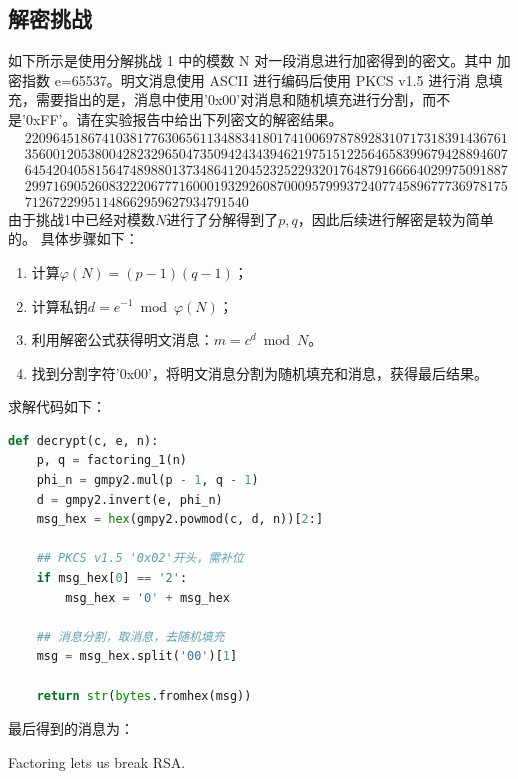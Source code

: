\subsection{解密挑战}

如下所示是使用分解挑战 1 中的模数 N 对一段消息进行加密得到的密文。其中
加密指数 e=65537。明文消息使用 ASCII 进行编码后使用 PKCS v1.5 进行消
息填充，需要指出的是，消息中使用'0x00'对消息和随机填充进行分割，而不
是'0xFF'。请在实验报告中给出下列密文的解密结果。\\

$
\begin{aligned}
    &220964518674103817763065611348834180174100697878928310717318391436761\\
        &356001205380042823296504735094243439462197515122564658399679428894607\\
        &645420405815647489880137348641204523252293201764879166664029975091887\\
        &299716905260832220677716000193292608700095799937240774589677736978175\\
        &71267229951148662959627934791540
\end{aligned}
$\\

由于挑战1中已经对模数$N$进行了分解得到了$p,q$，因此后续进行解密是较为简单的。
具体步骤如下：
\begin{enumerate}
    \item 计算$\varphi(N) = (p-1)(q-1)$；
    \item 计算私钥$d = e^{-1} \bmod \varphi(N)$；
    \item 利用解密公式获得明文消息：$m = c^d \bmod N$。
    \item 找到分割字符'0x00'，将明文消息分割为随机填充和消息，获得最后结果。
\end{enumerate}

求解代码如下：
\begin{lstlisting}[language = Python]
def decrypt(c, e, n):
    p, q = factoring_1(n)
    phi_n = gmpy2.mul(p - 1, q - 1)
    d = gmpy2.invert(e, phi_n)
    msg_hex = hex(gmpy2.powmod(c, d, n))[2:]

    ## PKCS v1.5 '0x02'开头，需补位
    if msg_hex[0] == '2':
        msg_hex = '0' + msg_hex
    
    ## 消息分割，取消息，去随机填充
    msg = msg_hex.split('00')[1]

    return str(bytes.fromhex(msg))
\end{lstlisting}

最后得到的消息为：
\begin{center}
    Factoring lets us break RSA.
\end{center}